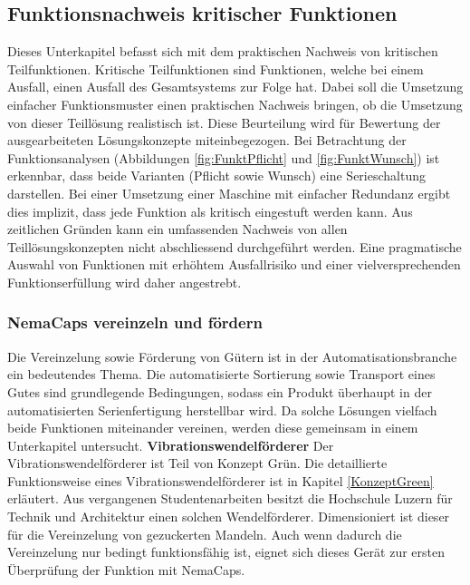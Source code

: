 \subsection{Funktionsnachweis kritischer Funktionen}
\label{funktionsnachweis}
Dieses Unterkapitel befasst sich mit dem praktischen Nachweis von kritischen Teilfunktionen. Kritische Teilfunktionen sind Funktionen, welche bei einem Ausfall, einen Ausfall des Gesamtsystems zur Folge hat. Dabei soll die Umsetzung einfacher Funktionsmuster einen praktischen Nachweis bringen, ob die Umsetzung von dieser Teillösung realistisch ist. Diese Beurteilung wird für Bewertung der ausgearbeiteten Lösungskonzepte miteinbegezogen.
\newline
Bei Betrachtung der Funktionsanalysen (Abbildungen \ref{fig:FunktPflicht} und \ref{fig:FunktWunsch}) ist erkennbar, dass beide Varianten (Pflicht sowie Wunsch) eine Serieschaltung darstellen. Bei einer Umsetzung einer Maschine mit einfacher Redundanz ergibt dies implizit, dass jede Funktion als kritisch eingestuft werden kann. Aus zeitlichen Gründen kann ein umfassenden Nachweis von allen Teillösungskonzepten nicht abschliessend durchgeführt werden. Eine pragmatische Auswahl von Funktionen mit erhöhtem Ausfallrisiko und einer vielversprechenden Funktionserfüllung wird daher angestrebt.

\subsubsection{NemaCaps vereinzeln und fördern}
Die Vereinzelung sowie Förderung von Gütern ist in der Automatisationsbranche ein bedeutendes Thema. Die automatisierte Sortierung sowie Transport eines Gutes sind grundlegende Bedingungen, sodass ein Produkt überhaupt in der automatisierten Serienfertigung herstellbar wird. Da solche Lösungen vielfach beide Funktionen miteinander vereinen, werden diese gemeinsam in einem Unterkapitel untersucht.
\newline
\newline
\textbf{Vibrationswendelförderer}
\newline
Der Vibrationswendelförderer ist Teil von Konzept Grün. Die detaillierte Funktionsweise eines Vibrationswendelförderer ist in Kapitel \ref{KonzeptGreen} erläutert.
\newline
Aus vergangenen Studentenarbeiten besitzt die Hochschule Luzern für Technik und Architektur einen solchen Wendelförderer. Dimensioniert ist dieser für die Vereinzelung von gezuckerten Mandeln. Auch wenn dadurch die Vereinzelung nur bedingt funktionsfähig ist, eignet sich dieses Gerät zur ersten Überprüfung der Funktion mit NemaCaps. 

